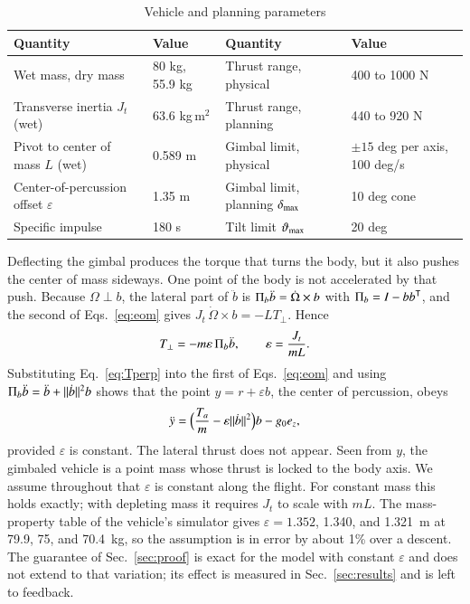 \begin{table}[t]\centering
\caption{Vehicle and planning parameters}\label{tab:vehicle}
\small
\begin{tabular}{@{}llll@{}}\toprule
Quantity & Value & Quantity & Value \\\midrule
Wet mass, dry mass & 80 kg, 55.9 kg & Thrust range, physical & 400 to 1000 N \\
Transverse inertia $J_t$ (wet) & 63.6 kg\,m$^2$ & Thrust range, planning & 440 to 920 N \\
Pivot to center of mass $L$ (wet) & 0.589 m & Gimbal limit, physical & $\pm15$ deg per axis, 100 deg/s \\
Center-of-percussion offset $\varepsilon$ & 1.35 m & Gimbal limit, planning $\delta_{\max}$ & 10 deg cone \\
Specific impulse & 180 s & Tilt limit $\vartheta_{\max}$ & 20 deg \\\bottomrule
\end{tabular}
\end{table}

Deflecting the gimbal produces the torque that turns the body, but it also pushes the center of mass sideways. One point of the
body is not accelerated by that push. Because $\Omega\perp b$, the lateral part of $\ddot b$ is $\Pi_b\ddot b=\dot\Omega\times b$
with $\Pi_b=I-bb^{\mathsf T}$, and the second of Eqs.~\eqref{eq:eom} gives $J_t\,\dot\Omega\times b=-LT_\perp$. Hence
\begin{equation}\label{eq:Tperp}
T_\perp=-m\varepsilon\,\Pi_b\ddot b,\qquad \varepsilon=\frac{J_t}{mL}.
\end{equation}
Substituting Eq.~\eqref{eq:Tperp} into the first of Eqs.~\eqref{eq:eom} and using $\Pi_b\ddot b=\ddot b+\lVert \dot b\rVert^2b$ shows
that the point $y=r+\varepsilon b$, the center of percussion, obeys
\begin{equation}\label{eq:cop}
\ddot y=\Bigl(\frac{T_a}{m}-\varepsilon\lVert \dot b\rVert^2\Bigr)b-g_0e_z ,
\end{equation}
provided $\varepsilon$ is constant. The lateral thrust does not appear. Seen from $y$, the gimbaled vehicle is a point mass
whose thrust is locked to the body axis. We assume throughout that $\varepsilon$ is constant along the flight. For constant mass
this holds exactly; with depleting mass it requires $J_t$ to scale with $mL$. The mass-property table of the vehicle's
simulator gives $\varepsilon=1.352$, 1.340, and 1.321~m at 79.9, 75, and 70.4~kg, so the assumption is in error by about 1\% over a descent.
The guarantee of Sec.~\ref{sec:proof} is exact for the model with constant $\varepsilon$ and does not extend to that variation;
its effect is measured in Sec.~\ref{sec:results} and is left to feedback.

